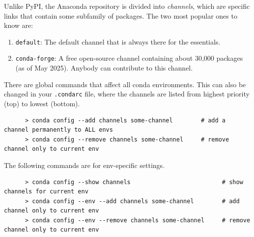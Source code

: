   Unlike PyPI, the Anaconda repository is divided into \textit{channels}, which are specific links that contain some subfamily of packages. The two most popular ones to know are: 
  \begin{enumerate}
    \item \texttt{default}: The default channel that is always there for the essentials. 
    \item \texttt{conda-forge}: A free open-source channel containing about 30,000 packages (as of May 2025). Anybody can contribute to this channel. 
  \end{enumerate} 

  \begin{example}
    \label{ex:manage-conda-channels}
    There are global commands that affect all conda environments. This can also be changed in your \texttt{.condarc} file, where the channels are listed from highest priority (top) to lowest (bottom). 
    \begin{lstlisting}
      > conda config --add channels some-channel        # add a channel permanently to ALL envs 
      > conda config --remove channels some-channel     # remove channel only to current env 
    \end{lstlisting}

    The following commands are for env-specific settings. 
    \begin{lstlisting}
      > conda config --show channels                          # show channels for current env
      > conda config --env --add channels some-channel        # add channel only to current env 
      > conda config --env --remove channels some-channel     # remove channel only to current env 
    \end{lstlisting}
  \end{example} 
  
